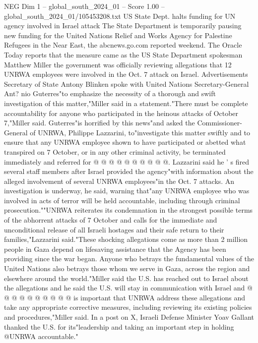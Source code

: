 \begin{textsample}{NEG Dim 1 – global\_south\_2024\_01 – Score 1.00 – global\_south\_2024\_01/105453208.txt}  \label{ex:f1_neg_336}
US State Dept. halts funding for UN agency involved in Israel attack The State Department is temporarily pausing new funding for the United Nations Relief and Works Agency for Palestine Refugees in the Near East, the abcnews.go.com reported weekend.
The Oracle Today reports that the measure came as the US State Department spokesman Matthew Miller the government was officially reviewing allegations that 12 UNRWA employees were involved in the Oct. 7 attack on Israel.
Advertisements Secretary of State Antony Blinken spoke with United Nations Secretary-General Ant? nio Guterres"to emphasize the necessity of a thorough and swift investigation of this matter,"Miller said in a statement."There must be complete accountability for anyone who participated in the heinous attacks of October 7,"Miller said.
Guterres"is horrified by this news"and asked the Commissioner-General of UNRWA, Philippe Lazzarini, to"investigate this matter swiftly and to ensure that any UNRWA employee shown to have participated or abetted what transpired on 7 October, or in any other criminal activity, be terminated immediately and referred for @ @ @ @ @ @ @ @ @ @.
Lazzarini said he ' s fired several staff members after Israel provided the agency"with information about the alleged involvement of several UNRWA employees"in the Oct. 7 attacks.
An investigation is underway, he said, warning that"any UNRWA employee who was involved in acts of terror will be held accountable, including through criminal prosecution.""UNRWA reiterates its condemnation in the strongest possible terms of the abhorrent attacks of 7 October and calls for the immediate and unconditional release of all Israeli hostages and their safe return to their families,"Lazzarini said."These shocking allegations come as more than 2 million people in Gaza depend on lifesaving assistance that the Agency has been providing since the war began.
Anyone who betrays the fundamental values of the United Nations also betrays those whom we serve in Gaza, across the region and elsewhere around the world."Miller said the U.S. has reached out to Israel about the allegations and he said the U.S. will stay in communication with Israel and @ @ @ @ @ @ @ @ @ @ is important that UNRWA address these allegations and take any appropriate corrective measures, including reviewing its existing policies and procedures,"Miller said.
In a post on X, Israeli Defense Minister Yoav Gallant thanked the U.S. for its"leadership and taking an important step in holding @UNRWA accountable."

\end{textsample}
